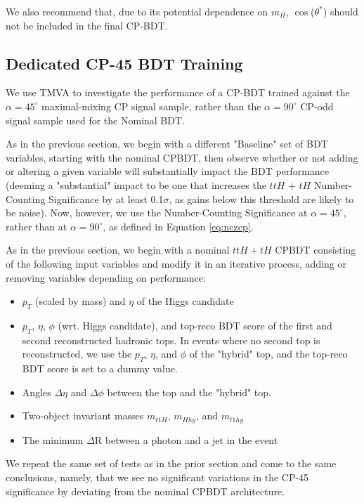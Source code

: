 We also recommend that, due to its potential dependence on $m_{H}$, $\cos$($\theta^{*}$) should not be included in the final CP-BDT.

\subsection{Dedicated CP-45 BDT Training}

We use TMVA to investigate the performance of a CP-BDT trained against the $\alpha = 45^{\circ}$ maximal-mixing CP signal sample, rather than the $\alpha = 90^{\circ}$ CP-odd signal sample used for the Nominal BDT.

As in the previous section, we begin with a different "Baseline" set of BDT variables, starting with the nominal CPBDT, then observe whether or not adding or altering a given variable will substantially impact the BDT performance (deeming a "substantial" impact to be one that increases the $ttH$ + $tH$ Number-Counting Significance by at least 0.1$\sigma$, as gains below this threshold are likely to be noise). Now, however, we use the Number-Counting Significance at $\alpha = 45^{\circ}$, rather than at $\alpha = 90^{\circ}$, as defined in Equation \ref{eq:nczcp}.

As in the previous section, we begin with a nominal $ttH+tH$ CPBDT consisting of the following input variables and modify it in an iterative process, adding or removing variables depending on performance:

\begin{itemize}
\item $p_{T}$ (scaled by mass) and $\eta$ of the Higgs candidate
\item $p_{T}$, $\eta$, $\phi$ (wrt. Higgs candidate), and top-reco BDT score of the first and second reconstructed hadronic tops. In events where no second top is reconstructed, we use the $p_{T}$, $\eta$, and $\phi$ of the "hybrid" top, and the top-reco BDT score is set to a dummy value.
\item Angles $\Delta\eta$ and $\Delta\phi$ between the top and the "hybrid" top.
\item Two-object invariant masses $m_{t1H}$, $m_{Hhy}$, and $m_{t1hy}$
\item The minimum $\Delta$R between a photon and a jet in the event
\end{itemize}

We repeat the same set of tests as in the prior section and come to the same conclusions, namely, that we see no significant variations in the CP-45 significance by deviating from the nominal CPBDT architecture.


